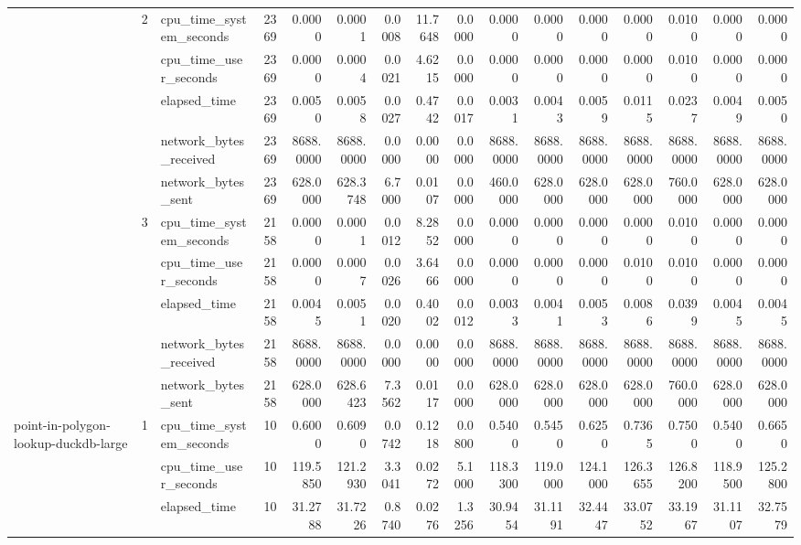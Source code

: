 \begin{tabular}{lllrrrrrrrrrrrrr}
\cline{2-16}
 & \multirow[t]{5}{*}{2} & cpu\_time\_system\_seconds & 2369 & 0.0000 & 0.0001 & 0.0008 & 11.7648 & 0.0000 & 0.0000 & 0.0000 & 0.0000 & 0.0000 & 0.0100 & 0.0000 & 0.0000 \\
 &  & cpu\_time\_user\_seconds & 2369 & 0.0000 & 0.0004 & 0.0021 & 4.6215 & 0.0000 & 0.0000 & 0.0000 & 0.0000 & 0.0000 & 0.0100 & 0.0000 & 0.0000 \\
 &  & elapsed\_time & 2369 & 0.0050 & 0.0058 & 0.0027 & 0.4742 & 0.0017 & 0.0031 & 0.0043 & 0.0059 & 0.0115 & 0.0237 & 0.0049 & 0.0050 \\
 &  & network\_bytes\_received & 2369 & 8688.0000 & 8688.0000 & 0.0000 & 0.0000 & 0.0000 & 8688.0000 & 8688.0000 & 8688.0000 & 8688.0000 & 8688.0000 & 8688.0000 & 8688.0000 \\
 &  & network\_bytes\_sent & 2369 & 628.0000 & 628.3748 & 6.7000 & 0.0107 & 0.0000 & 460.0000 & 628.0000 & 628.0000 & 628.0000 & 760.0000 & 628.0000 & 628.0000 \\
\cline{2-16}
 & \multirow[t]{5}{*}{3} & cpu\_time\_system\_seconds & 2158 & 0.0000 & 0.0001 & 0.0012 & 8.2852 & 0.0000 & 0.0000 & 0.0000 & 0.0000 & 0.0000 & 0.0100 & 0.0000 & 0.0000 \\
 &  & cpu\_time\_user\_seconds & 2158 & 0.0000 & 0.0007 & 0.0026 & 3.6466 & 0.0000 & 0.0000 & 0.0000 & 0.0000 & 0.0100 & 0.0100 & 0.0000 & 0.0000 \\
 &  & elapsed\_time & 2158 & 0.0045 & 0.0051 & 0.0020 & 0.4002 & 0.0012 & 0.0033 & 0.0041 & 0.0053 & 0.0086 & 0.0399 & 0.0045 & 0.0045 \\
 &  & network\_bytes\_received & 2158 & 8688.0000 & 8688.0000 & 0.0000 & 0.0000 & 0.0000 & 8688.0000 & 8688.0000 & 8688.0000 & 8688.0000 & 8688.0000 & 8688.0000 & 8688.0000 \\
 &  & network\_bytes\_sent & 2158 & 628.0000 & 628.6423 & 7.3562 & 0.0117 & 0.0000 & 628.0000 & 628.0000 & 628.0000 & 628.0000 & 760.0000 & 628.0000 & 628.0000 \\
\cline{1-16} \cline{2-16}
\multirow[t]{15}{*}{point-in-polygon-lookup-duckdb-large} & \multirow[t]{5}{*}{1} & cpu\_time\_system\_seconds & 10 & 0.6000 & 0.6090 & 0.0742 & 0.1218 & 0.0800 & 0.5400 & 0.5450 & 0.6250 & 0.7365 & 0.7500 & 0.5400 & 0.6650 \\
 &  & cpu\_time\_user\_seconds & 10 & 119.5850 & 121.2930 & 3.3041 & 0.0272 & 5.1000 & 118.3300 & 119.0000 & 124.1000 & 126.3655 & 126.8200 & 118.9500 & 125.2800 \\
 &  & elapsed\_time & 10 & 31.2788 & 31.7226 & 0.8740 & 0.0276 & 1.3256 & 30.9454 & 31.1191 & 32.4447 & 33.0752 & 33.1967 & 31.1107 & 32.7579 \\

\end{tabular}
